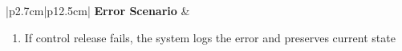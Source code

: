 \begin{table}[H]
\begin{tabular}{|p{2.7cm}|p{12.5cm}|}
            \hline
            \textbf{Error Scenario} & \begin{minipage}[t]{\linewidth}
                                          \begin{enumerate}[topsep=0pt,itemsep=1pt,parsep=0pt,partopsep=0pt]
                                              \item If control release fails, the system logs the error and preserves current state
                                          \end{enumerate}
                                      \end{minipage} \\
            \hline
        \end{tabular}
        \label{tab:eng-release-camera}
    \end{table}

